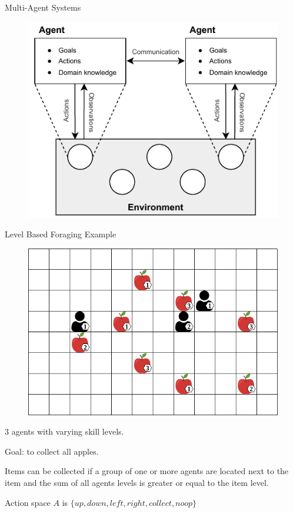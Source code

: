 \begin{frame}{Multi-Agent Systems}		
    \begin{figure}
        \centering
        \includegraphics[width=\textwidth,height=.9\textheight,keepaspectratio]{images/chapter_1/mas_schematic.pdf}
        \label{fig:enter-label}
    \end{figure}
\end{frame}

\begin{frame}{Level Based Foraging Example}

    \begin{figure}
        \centering
        \includegraphics[width=\textwidth,height=.425\textheight,keepaspectratio]{images/environments/lbf/foraging_8x12_b.png}
        \label{fig:enter-label}
    \end{figure}

    \blist
        \item 3 agents with varying skill levels.
        \item Goal: to collect all apples.
        \item Items can be collected if a group of one or more agents are located next to the item and the sum of all agents levels is greater or equal to the item level. 
        \item Action space $A$ is $\{up, down, left, right, collect, noop\}$
    \elist
\end{frame}

